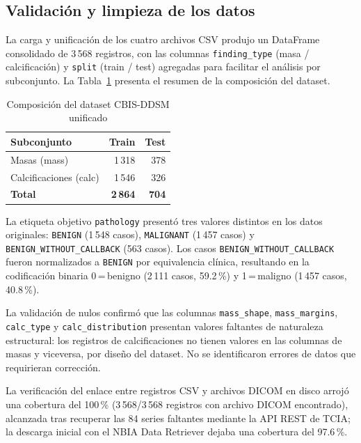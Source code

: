 
\subsection{Validación y limpieza de los datos}

La carga y unificación de los cuatro archivos CSV produjo
un DataFrame consolidado de 3\,568 registros, con las
columnas \texttt{finding\_type} (masa / calcificación) y
\texttt{split} (train / test) agregadas para facilitar
el análisis por subconjunto. La Tabla~\ref{tab:eda_resumen}
presenta el resumen de la composición del dataset.

\begin{table}[htbp]
\centering
\caption{Composición del dataset CBIS-DDSM unificado}
\label{tab:eda_resumen}
\renewcommand{\arraystretch}{1.3}
\begin{tabularx}{\textwidth}{@{}Xrr@{}}
\toprule
\textbf{Subconjunto} &
\textbf{Train} & \textbf{Test} \\
\midrule
Masas (mass)           & 1\,318 & 378 \\
Calcificaciones (calc) & 1\,546 & 326 \\
\midrule
\textbf{Total}         & \textbf{2\,864} &
                         \textbf{704} \\
\bottomrule
\end{tabularx}
\end{table}

La etiqueta objetivo \texttt{pathology} presentó tres
valores distintos en los datos originales:
\texttt{BENIGN} (1\,548 casos),
\texttt{MALIGNANT} (1\,457 casos) y
\texttt{BENIGN\_WITHOUT\_CALLBACK} (563 casos).
Los casos \texttt{BENIGN\_WITHOUT\_CALLBACK} fueron
normalizados a \texttt{BENIGN} por equivalencia clínica,
resultando en la codificación binaria
0\,=\,benigno (2\,111 casos, 59.2\,\%) y
1\,=\,maligno (1\,457 casos, 40.8\,\%).

La validación de nulos confirmó que las columnas
\texttt{mass\_shape}, \texttt{mass\_margins},
\texttt{calc\_type} y \texttt{calc\_distribution}
presentan valores faltantes de naturaleza estructural:
los registros de calcificaciones no tienen valores en
las columnas de masas y viceversa, por diseño del
dataset. No se identificaron errores de datos que
requirieran corrección.

La verificación del enlace entre registros CSV y
archivos DICOM en disco arrojó una cobertura del
100\,\% (3\,568/3\,568 registros con archivo
DICOM encontrado), alcanzada tras recuperar las 84 series
faltantes mediante la API REST de TCIA; la descarga inicial
con el NBIA Data Retriever dejaba una cobertura del 97.6\,\%.
